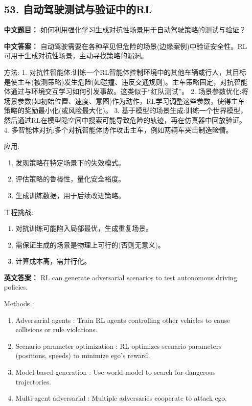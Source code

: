\documentclass[10pt,a4paper]{ctexart}
\begin{document}
\subsection*{53. 自动驾驶测试与验证中的RL}
\textbf{中文题目：} 如何利用强化学习生成对抗性场景用于自动驾驶策略的测试与验证？

\textbf{中文答案：}  
自动驾驶需要在各种罕见但危险的场景(边缘案例)中验证安全性。RL可用于生成对抗性场景，主动寻找策略的漏洞。

 方法:
1.  对抗性智能体:训练一个RL智能体控制环境中的其他车辆或行人，其目标是使主车(被测策略)发生危险(如碰撞、违反交通规则)。主车策略固定，对抗智能体通过与环境交互学习如何引发事故。这类似于“红队测试”。
2.  场景参数优化:将场景参数(如初始位置、速度、意图)作为动作，RL学习调整这些参数，使得主车策略的奖励最小化(或风险最大化)。
3.  基于模型的场景生成:训练一个世界模型，然后通过RL在模型隐空间中搜索可能导致危险的轨迹，再在仿真器中回放验证。
4.  多智能体对抗:多个对抗智能体协作攻击主车，例如两辆车夹击制造险情。

 应用:
\begin{enumerate}
    \item 发现策略在特定场景下的失效模式。
    \item 评估策略的鲁棒性，量化安全裕度。
    \item 生成训练数据，用于后续改进策略。
\end{enumerate}

 工程挑战:
\begin{enumerate}
    \item 对抗训练可能陷入局部最优，生成重复场景。
    \item 需保证生成的场景是物理上可行的(否则无意义)。
    \item 计算成本高，需并行化。
\end{enumerate}

\textbf{英文答案：}  
RL can generate adversarial scenarios to test autonomous driving policies.

 Methods :
\begin{enumerate}
    \item Adversarial agents : Train RL agents controlling other vehicles to cause collisions or rule violations.
    \item Scenario parameter optimization : RL optimizes scenario parameters (positions, speeds) to minimize ego's reward.
    \item Model-based generation : Use world model to search for dangerous trajectories.
    \item Multi-agent adversarial : Multiple adversaries cooperate to attack ego.
\end{enumerate}
\end{document}
